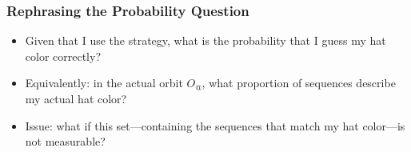 \begin{frame}
\frametitle{Rephrasing the Probability Question}

\begin{itemize}[<+->]

\item Given that I use the strategy, what is the probability that I guess my hat color correctly?

\item Equivalently: in the actual orbit $O_@$, what proportion of sequences describe my actual hat color? 

\item Issue: what if this set---containing the sequences that match my hat color---is not measurable? 





\end{itemize}
\end{frame}

